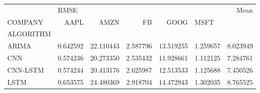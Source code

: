 \begin{tabular}{lrrrrrr}
\toprule
{} & \multicolumn{5}{l}{RMSE} &      Mean \\
COMPANY &      AAPL &       AMZN &        FB &       GOOG & \multicolumn{2}{l}{MSFT} \\
ALGORITHM &           &            &           &            &           &           \\
\midrule
ARIMA     &  0.642592 &  22.110443 &  2.587796 &  13.519255 &  1.259657 &  8.023949 \\
CNN       &  0.574236 &  20.273350 &  2.535432 &  11.928661 &  1.112125 &  7.284761 \\
CNN-LSTM  &  0.574244 &  20.413176 &  2.625987 &  12.513533 &  1.125688 &  7.450526 \\
LSTM      &  0.653575 &  24.480369 &  2.918704 &  14.472943 &  1.302035 &  8.765525 \\
\bottomrule
\end{tabular}
